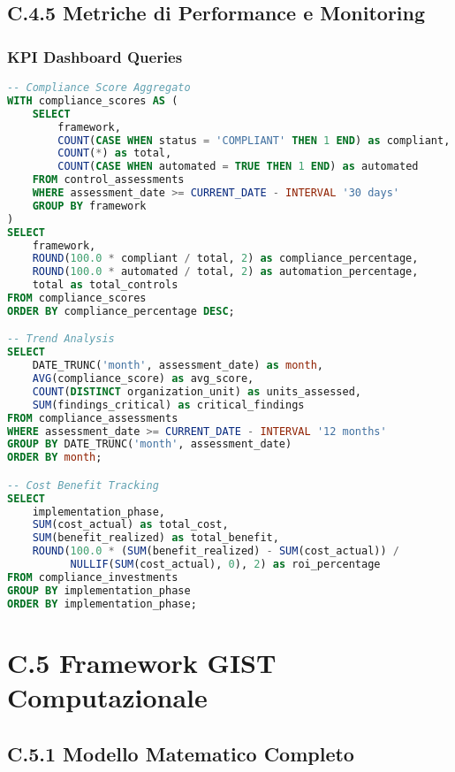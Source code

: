 \subsection{C.4.5 Metriche di Performance e Monitoring}

\subsubsection{KPI Dashboard Queries}

\begin{lstlisting}[language=SQL, caption=Query per Compliance Dashboard]
-- Compliance Score Aggregato
WITH compliance_scores AS (
    SELECT 
        framework,
        COUNT(CASE WHEN status = 'COMPLIANT' THEN 1 END) as compliant,
        COUNT(*) as total,
        COUNT(CASE WHEN automated = TRUE THEN 1 END) as automated
    FROM control_assessments
    WHERE assessment_date >= CURRENT_DATE - INTERVAL '30 days'
    GROUP BY framework
)
SELECT 
    framework,
    ROUND(100.0 * compliant / total, 2) as compliance_percentage,
    ROUND(100.0 * automated / total, 2) as automation_percentage,
    total as total_controls
FROM compliance_scores
ORDER BY compliance_percentage DESC;

-- Trend Analysis
SELECT 
    DATE_TRUNC('month', assessment_date) as month,
    AVG(compliance_score) as avg_score,
    COUNT(DISTINCT organization_unit) as units_assessed,
    SUM(findings_critical) as critical_findings
FROM compliance_assessments
WHERE assessment_date >= CURRENT_DATE - INTERVAL '12 months'
GROUP BY DATE_TRUNC('month', assessment_date)
ORDER BY month;

-- Cost Benefit Tracking
SELECT 
    implementation_phase,
    SUM(cost_actual) as total_cost,
    SUM(benefit_realized) as total_benefit,
    ROUND(100.0 * (SUM(benefit_realized) - SUM(cost_actual)) / 
          NULLIF(SUM(cost_actual), 0), 2) as roi_percentage
FROM compliance_investments
GROUP BY implementation_phase
ORDER BY implementation_phase;
\end{lstlisting}

\section{C.5 Framework GIST Computazionale}

\subsection{C.5.1 Modello Matematico Completo}

